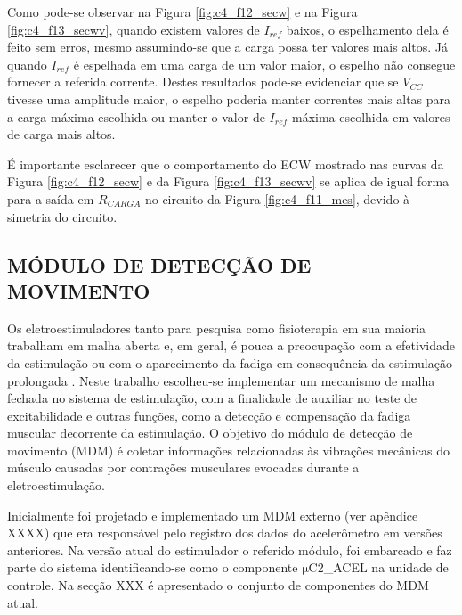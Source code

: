 Como pode-se observar na Figura \ref{fig:c4_f12_secw} e na Figura \ref{fig:c4_f13_secwv}, quando existem valores de $I_{ref}$ baixos, o espelhamento dela é feito sem erros, mesmo assumindo-se que a carga possa ter valores mais altos. Já quando $I_{ref}$ é espelhada em uma carga de um valor maior, o espelho não consegue fornecer a referida corrente. Destes resultados pode-se evidenciar que se $V_{CC}$ tivesse uma amplitude maior, o espelho poderia manter correntes mais altas para a carga máxima escolhida ou manter o valor de $I_{ref}$ máxima escolhida em valores de carga mais altos.

É importante esclarecer que o comportamento do \acrshort{ECW} mostrado nas curvas da Figura \ref{fig:c4_f12_secw} e da Figura \ref{fig:c4_f13_secwv} se aplica de igual forma para a saída em $R_{CARGA}$ no circuito da Figura \ref{fig:c4_f11_mes}, devido à simetria do circuito. 


\subsection{MÓDULO DE DETECÇÃO DE MOVIMENTO} 

Os eletroestimuladores tanto para pesquisa como fisioterapia em sua maioria trabalham em malha aberta e, em geral, é pouca a preocupação com a efetividade da estimulação ou com o aparecimento da fadiga em consequência da estimulação prolongada \cite{Sanches2013SistemaParaplegicos}. Neste trabalho escolheu-se implementar um mecanismo de malha fechada no sistema de estimulação, com a finalidade de auxiliar no teste de excitabilidade e outras funções, como a detecção e compensação da fadiga muscular decorrente da estimulação. O objetivo do módulo de detecção de movimento (\acrshort{MDM}) é coletar informações relacionadas às vibrações mecânicas do músculo causadas por contrações musculares evocadas durante a eletroestimulação.




Inicialmente foi projetado e implementado um \acrshort{MDM} externo (ver apêndice XXXX) que era responsável pelo registro dos dados do acelerômetro em versões anteriores. Na versão atual do estimulador o referido módulo, foi embarcado e faz parte do sistema identificando-se como o componente $\mathrm{\mu}$C2\_ACEL na unidade de controle. Na secção XXX é apresentado o conjunto de componentes do \acrshort{MDM} atual.

